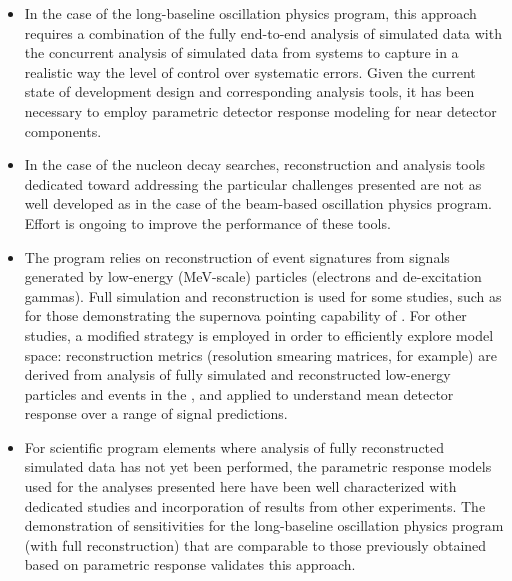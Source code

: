 \begin{itemize}
\item In the case of the long-baseline oscillation physics
      program, this approach requires a combination of the 
      fully end-to-end analysis of simulated  data
      with the concurrent analysis of simulated data from
       systems to capture in a realistic way 
      the level of 
      control over systematic errors.  Given the 
      current state of development   design and 
      corresponding analysis tools,  it has been necessary to 
      employ parametric detector response modeling for near 
      detector components. 

\item In the case of the nucleon decay searches, 
      reconstruction and analysis tools dedicated toward
      addressing the particular challenges presented are 
      not as well developed as in the case of the 
      beam-based oscillation physics program. Effort is 
      ongoing to improve the performance of these tools. 

\item The   program relies on 
reconstruction of event signatures from  signals 
generated by low-energy (MeV-scale) particles (electrons 
and de-excitation gammas).  Full simulation and reconstruction 
is used for some studies, such as for those demonstrating 
the supernova pointing capability of .  
For other studies, a modified strategy is employed in order 
to efficiently explore model space:  reconstruction metrics 
(resolution smearing matrices, for example) are derived 
from analysis of fully simulated and reconstructed low-energy 
particles and events in the , and applied to 
understand mean detector response over a range of signal predictions.

\item For scientific program elements where
      analysis of fully reconstructed simulated data has 
      not yet been performed, the parametric response models 
      used for the analyses presented here have
      been well characterized with dedicated studies
      and incorporation of results from other experiments.
      The demonstration of sensitivities for the long-baseline
      oscillation physics program (with full reconstruction) 
      that are comparable to those
      previously obtained based on parametric response
      validates this approach.
\end{itemize}


